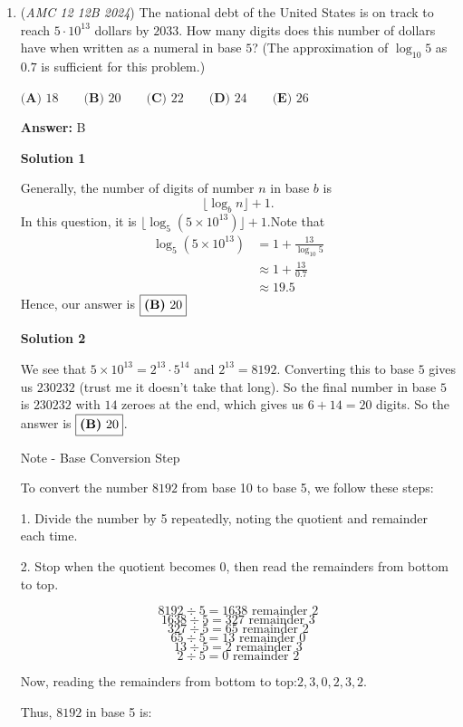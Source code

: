 \begin{enumerate}
 


	\item (\textit{AMC 12 12B 2024}) The national debt of the United States is on track to reach $5 \cdot 10^{13}$ dollars by $2033$. How many digits does this number of dollars have when written as a numeral in base $5$? (The approximation of $\log_{10} 5$ as $0.7$ is sufficient for this problem.)


 $\textbf{(A) }18 \qquad \textbf{(B) }20 \qquad \textbf{(C) }22 \qquad \textbf{(D) }24 \qquad \textbf{(E) }26 \qquad$

 \textbf{Answer: }B



\textbf{Solution 1}

Generally, the number of digits of number $n$ in base $b$ is
 \[\lfloor \log_b n \rfloor + 1.\]In this question, it is $\lfloor \log_{5} (5\times 10^{13})\rfloor+1$.Note that 
 \begin{align*} \log_{5} (5\times 10^{13}) &= 1+\frac{13}{\log_{10} 5} \\ &\approx 1+\frac{13}{0.7} \\ &\approx 19.5 \end{align*}
Hence, our answer is $\fbox{\textbf{(B)} 20}$




\textbf{Solution 2}

We see that $5\times 10^{13} = 2^{13} \cdot 5^{14}$ and $2^{13} = 8192$. Converting this to base $5$ gives us $230232$ (trust me it doesn't take that long). So the final number in base $5$ is $230232$ with $14$ zeroes at the end, which gives us $6 + 14 = 20$ digits. So the answer is $\fbox{\textbf{(B)} 20}$.

 Note - Base Conversion Step 

 To convert the number $8192$ from base 10 to base 5, we follow these steps:

 1. Divide the number by 5 repeatedly, noting the quotient and remainder each time.

 2. Stop when the quotient becomes 0, then read the remainders from bottom to top.

 
 \[8192 \div 5 = 1638 \text{ remainder } 2\]
 \[1638 \div 5 = 327 \text{ remainder } 3\]
 \[327 \div 5 = 65 \text{ remainder } 2\]
 \[65 \div 5 = 13 \text{ remainder } 0\]
 \[13 \div 5 = 2 \text{ remainder } 3\]
 \[2 \div 5 = 0 \text{ remainder } 2\]

 Now, reading the remainders from bottom to top:$2, 3, 0, 2, 3, 2$.

 Thus, $8192$ in base 5 is:


\end{enumerate}
